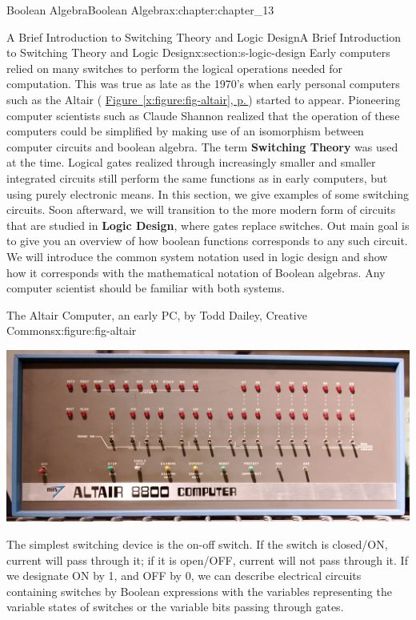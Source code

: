 \documentclass[twoside,10pt,]{book}
\newcommand{\xreffont}{\relax}
\newcommand{\terminology}[1]{\textbf{#1}}
\numberwithin{equation}{section}
\begin{document}
\begin{chapterptx}{Boolean Algebra}{}{Boolean Algebra}{}{}{x:chapter:chapter_13}
\begin{sectionptx}{A Brief Introduction to Switching Theory and Logic Design}{}{A Brief Introduction to Switching Theory and Logic Design}{}{}{x:section:s-logic-design}
Early computers relied on many switches to perform the logical operations needed for computation.  This was true as late as the 1970's when early personal computers such as the Altair ( \hyperref[x:figure:fig-altair]{Figure~{\xreffont\ref{x:figure:fig-altair}}, p.\,\pageref{x:figure:fig-altair}}) started to appear. Pioneering computer scientists such as Claude Shannon realized that the operation of these computers could be simplified by making use of an isomorphism between computer circuits and boolean algebra.   The term \terminology{Switching Theory} was used at the time.  Logical gates realized through increasingly smaller and smaller integrated circuits still perform the same functions as in early computers, but using purely electronic means.  In this section, we give examples of some switching circuits.  Soon afterward, we will transition to the more modern form of circuits that are studied in \terminology{Logic Design}, where gates replace switches.  Out main goal is to give you an overview of how boolean functions corresponds to any such circuit.  We will introduce the common system notation used in logic design and show how it corresponds with the mathematical notation of Boolean algebras.  Any computer scientist should be familiar with both systems.%
\begin{figureptx}{The Altair Computer, an early PC, by Todd Dailey, Creative Commons}{x:figure:fig-altair}{}%
\begin{image}{0.1}{0.8}{0.1}%
\includegraphics[width=\linewidth]{images/fig-altair.jpg}
\end{image}%
\tcblower
\end{figureptx}%
The simplest switching device is the on-off switch. If the switch is closed\slash{}ON, current will pass through it; if it is open\slash{}OFF, current will not pass through it. If we designate ON by 1, and OFF by 0, we can describe electrical circuits containing switches by Boolean expressions with the variables representing the variable states of switches or the variable bits passing through gates.%

\end{sectionptx}
\end{chapterptx}
\end{document}
